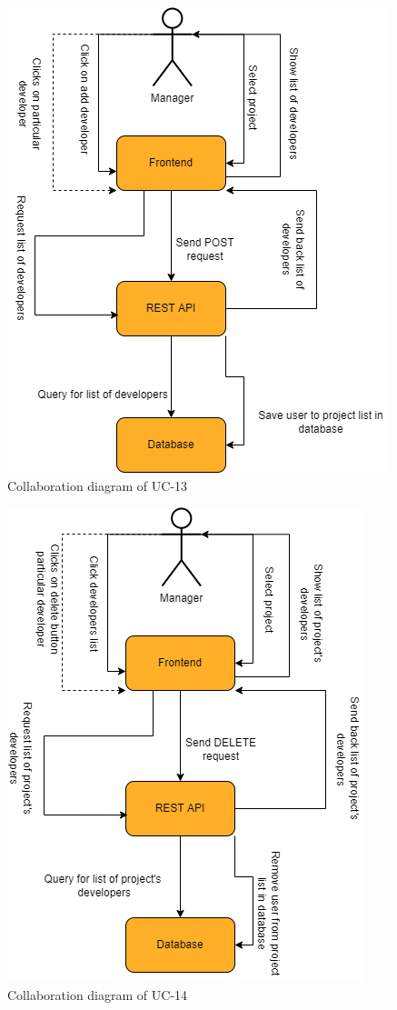 \begin{figure}[H]
    \centering
    \includegraphics[scale=0.5]{./diagrams/collaboration/cd-13.png}
    \caption{Collaboration diagram of UC-13}
    \label{fig:cd-13}
    
\end{figure}


\begin{figure}[H]
    \centering
    \includegraphics[scale=0.5]{./diagrams/collaboration/cd-14.png}
    \caption{Collaboration diagram of UC-14}
    \label{fig:cd-14}
    
\end{figure}


